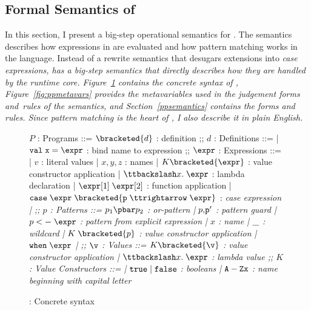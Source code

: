 \documentclass[manuscript,screen,review, 12pt, nonacm]{acmart}
\begin{document}
\subsection{Formal Semantics of \PPlus}

    In this section, I present a big-step operational semantics for \PPlus. The
    semantics describes how expressions in \PPlus are evaluated and how pattern
    matching works in the language. Instead of a rewrite semantics that desugars
    extensions into \it{case} expressions, \PPlus has a big-step semantics that
    directly describes how they are handled by the runtime core.
    Figure~\ref{fig:ppsyntax} contains the concrete syntax of \PPlus,
    Figure~\ref{fig:ppmetavars} provides the metavariables used in the judgement
    forms and~rules of the semantics, and Section~\ref{ppsemantics} contains the
    forms and rules. Since pattern matching is the heart of \PPlus, I also
    describe it in plain English.

\begin{figure}
\begin{center}
\begin{bnf}
$P$ : \textsf{Programs} ::=
$\bracketed{d}$ : definition
;;
$d$ : \textsf{Definitions} ::=
| $\tt{val}\; x\; \tt{=}\; \expr$ : bind name to expression
;;
$\expr$ : Expressions ::= 
| $v$ : literal values 
| $x, y, z$ : names
| $K\bracketed{\expr}$ : value constructor application 
| $\ttbackslash x.\; \expr$ : lambda declaration  
| $\expr[1]\; \expr[2]$ : function application 
| $\tt{case}\; \expr\; \bracketed{p\; \ttrightarrow\; \expr}$ : \it{case} expression 
| \ttbraced{$\expr$}
;;
$p$ : \textsf{Patterns} ::= $p_{1}\pbar p_{2}$ : or-pattern
| $p \tt{,} p'$ : pattern guard 
| $p\; \tt{<-}\; \expr$ : pattern from explicit expression  
| $x$ : name 
| $\tt{\_}$ : wildcard 
| $K\; \bracketed{p}$ : value constructor application 
| $\tt{when}\; \expr$
| 
;;
$\v$ : Values ::= $K\bracketed{\v}$ : value constructor application 
| $\ttbackslash x.\; \expr$ : lambda value 
;;
$K$ : \textsf{Value Constructors} ::=
| $\tt{true}\; \vert\; \tt{false}$ : booleans
| $\tt{A-Z}x$ : name beginning with capital letter
\end{bnf}
\end{center}
\caption{\PPlus: Concrete syntax}
\label{fig:ppsyntax}
\end{figure}

\end{document}
